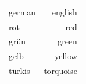 \documentclass{article}
\begin{document}
\begin{center}
  \begin{tabular}{lr}
    german & english \\
    rot    & red \\
    grün   & green \\
    gelb   & yellow \\
    türkis & torquoise \\
  \end{tabular}
\end{center}
\end{document}
